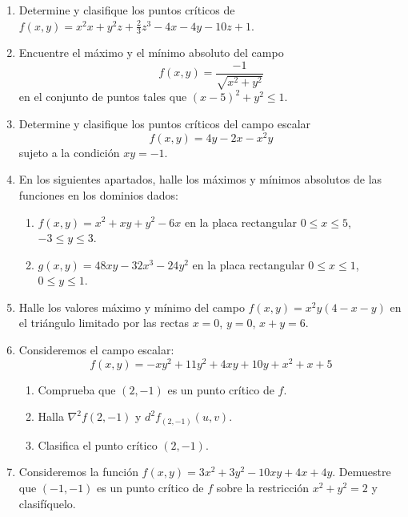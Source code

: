 \begin{enumerate}
\item
Determine y clasifique los puntos críticos de
$f(x,y)=x^2x+y^2z+\frac23z^3-4x-4y-10z+1$.


\item
Encuentre el máximo y el mínimo absoluto del campo
\[
f(x,y)=\frac{-1}{\sqrt{x^2+y^2}}
\]
en el conjunto de puntos tales que $(x-5)^2+y^2\le1$.

\item
Determine y clasifique los puntos críticos del campo escalar
$$ 
f(x,y)=4y-2x-x^2y
$$ 
sujeto a la condición $xy=-1$.


\item
En los siguientes apartados, halle los máximos y mínimos
absolutos de las funciones en los dominios dados:
\begin{enumerate}
\item
$f(x,y)=x^2+xy+y^2-6x$ en la placa rectangular $0\leq x \leq 5$,
$-3\leq y \leq 3$.
\item
$g(x,y)=48xy-32x^3-24y^2$ en la placa rectangular $0\leq x \leq 1$,
$0\leq y \leq 1$.
\end{enumerate}

\item
Halle los valores máximo y mínimo del campo $f(x,y)=x^2y(4-x-y)$ en el triángulo limitado por las rectas $x=0$, $y=0$, $x+y=6$.

\item 
Consideremos el campo escalar:
\[
f(x,y)=-xy^2+11y^2+4xy+10y+x^2+x+5
\]

\begin{enumerate}
\item
Comprueba que $(2,-1)$ es un punto crítico de $f$.
\item
Halla $\nabla^2f(2,-1)$ y $d^2f_{(2,-1)}(u,v)$.
\item
Clasifica el punto crítico $(2,-1)$.
\end{enumerate}

\item
Consideremos la función $f(x,y)=3x^2+3y^2-10xy+4x+4y$.
Demuestre que $(-1,-1)$ es un punto crítico de $f$ sobre la restricción $x^2+y^2=2$ y clasifíquelo.

\end{enumerate}

%

%
%

\endinput
